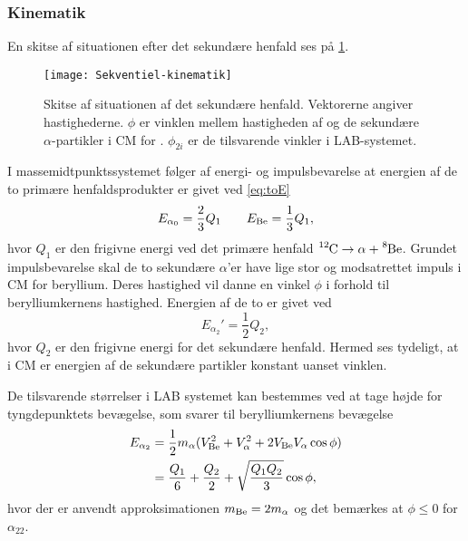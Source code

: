 \subsubsection{Kinematik}
\label{sec:sekv-kinematik}

En skitse af situationen efter det sekundære henfald ses på \cref{fig:secundary}.
\begin{figure}[h]
  \centering
  \texttt{[image: Sekventiel-kinematik]}
  \caption{Skitse af situationen af det sekundære henfald. Vektorerne angiver hastighederne. $\phi$ er
    vinklen mellem hastigheden af \Be og de sekundære $\alpha$-partikler i CM for \Be. $\phi_{2i}$ er
    de tilsvarende vinkler i LAB-systemet.}
  \label{fig:secundary}
\end{figure}

I massemidtpunktssystemet følger af energi- og impulsbevarelse at energien af de to primære
henfaldsprodukter er givet ved \cref{eq:toE}
\begin{equation}
  \label{eq:Ealpha0}
  E_{\alpha_{0}} = \frac{2}{3} Q_{1} \qquad E_{\ce{Be}} = \frac{1}{3} Q_{1},
\end{equation}
hvor $Q_{1}$ er den frigivne energi ved det primære henfald $\Carb \rightarrow \alpha + \Be$. Grundet
impulsbevarelse skal de to sekundære $\alpha$'er have lige stor og modsatrettet impuls i CM for
beryllium. Deres hastighed vil danne en vinkel $\phi$ i forhold til berylliumkernens
hastighed. Energien af de to er givet ved
\begin{equation}
  \label{eq:Ealpha2}
  E_{\alpha_{2}}' = \frac{1}{2} Q_{2},
\end{equation}
hvor $Q_{2}$ er den frigivne energi for det sekundære henfald. Hermed ses tydeligt, at i CM er
energien af de sekundære partikler konstant uanset vinklen.

De tilsvarende størrelser i LAB systemet kan bestemmes ved at tage højde for tyngdepunktets
bevægelse, som svarer til berylliumkernens bevægelse
\begin{align}
  E_{\alpha_{2}} %
  &= \frac{1}{2}m_{\alpha} (V_{\ce{Be}}^{2} + V_{\alpha}^{2} + 2V_{\ce{Be}}V_{\alpha} \cos \phi) \notag \\
  &= \frac{Q_{1}}{6} + \frac{Q_{2}}{2} + \sqrt{\frac{Q_{1}Q_{2}}{3}} \cos \phi,           
  \label{eq:E2LAB} 
\end{align}
hvor der er anvendt approksimationen $m_{\ce{Be}} = 2m_{\alpha}$ og det bemærkes at $\phi \leq 0$ for $\alpha_{22}$. 

